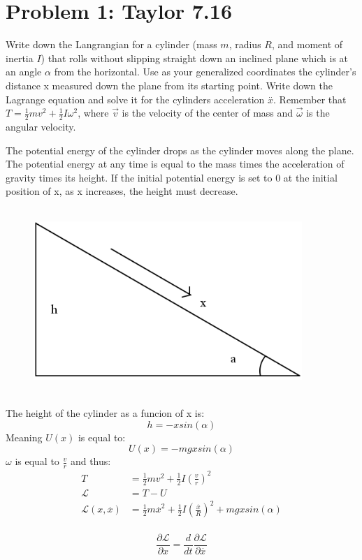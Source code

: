 \documentclass[a4paper,12pt]{article}
\newcommand{\F}[2]{\ensuremath{\frac{#1}{#2}}}
\newcommand{\V}[1]{\ensuremath{\vec{#1}}}
\newcommand{\vel}[1]{\overset{.}{#1}}
\newcommand{\acc}[1]{\overset{..}{#1}}
\newcommand{\LP}{\left(}
\newcommand{\RP}{\right)}
\begin{document}
\section*{Problem 1: Taylor 7.16}
Write down the Langrangian for a cylinder (mass $m$, radius $R$, and moment of inertia $I$) that rolls without slipping straight down an inclined plane which is at an angle $\alpha$ from the horizontal.  Use as your generalized coordinates the cylinder's distance x measured down the plane from its starting point.  Write down the Lagrange equation and solve it for the cylinders acceleration $\acc{x}$. Remember that $T= \F{1}{2}mv^2+\F{1}{2}I\omega^2$, where $\V{v}$ is the velocity of the center of mass and $\V{\omega}$ is the angular velocity.

The potential energy of the cylinder drops as the cylinder moves along the plane.  The potential energy at any time is equal to the mass times the acceleration of gravity times its height.  If the initial potential energy is set to 0 at the initial position of x, as x increases, the height must decrease.\\ \\
\begin{figure}[h]
\centering
\includegraphics[width=4in]{incline.png}\\
\end{figure}\\
The height of the cylinder as a funcion of x is:
\[h=-xsin(\alpha)\]
Meaning $U(x)$ is equal to:
\[U(x)=-mgxsin(\alpha)\]
$\omega$ is equal to $\F{v}{r}$ and thus:
\begin{align*}
T&=\F{1}{2}mv^2+\F{1}{2}I\LP\F{v}{r}\RP^2\\
\mathcal{L}&=T-U\\
\mathcal{L}(x,\vel{x})&=\F{1}{2}m\vel{x}^2+\F{1}{2}I\LP\F{\vel{x}}{R}\RP^2+mgxsin(\alpha)
\end{align*}\\
\[\F{\partial{\mathcal{L}}}{\partial{x}}=\F{d}{dt}\F{\partial{\mathcal{L}}}{\partial{\vel{x}}}\]
\end{document}
